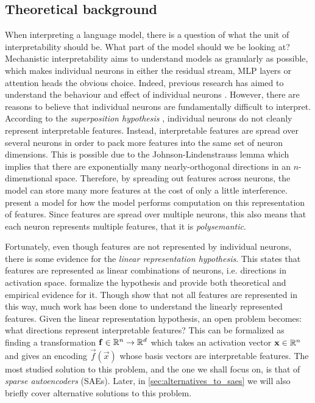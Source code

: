 \subsection{Theoretical background}
When interpreting a language model, there is a question of what the unit of interpretability should be.
What part of the model should we be looking at?
Mechanistic interpretability aims to understand models as granularly as possible, which makes individual neurons in either the residual stream, MLP layers or attention heads the obvious choice.
Indeed, previous research has aimed to understand the behaviour and effect of individual neurons \parencite{foote_neuron_2023}\parencite{bills_language_2023}.
However, there are reasons to believe that individual neurons are fundamentally difficult to interpret.
According to the \emph{superposition hypothesis} \parencite{elhage_toy_2022}, individual neurons do not cleanly represent interpretable features.
Instead, interpretable features are spread over several neurons in order to pack more features into the same set of neuron dimensions.
This is possible due to the Johnson-Lindenstrauss lemma which implies that there are exponentially many nearly-orthogonal directions in an $n$-dimenstional space.
Therefore, by spreading out features across neurons, the model can store many more features at the cost of only a little interference.
\textcite{vaintrob_toward_2024} present a model for how the model performs computation on this representation of features.
Since features are spread over multiple neurons, this also means that each neuron represents multiple features, that it is \emph{polysemantic}.

Fortunately, even though features are not represented by individual neurons, there is some evidence for the \emph{linear representation hypothesis}.
This states that features are represented as linear combinations of neurons, i.e. directions in activation space.
\textcite{park_linear_2023} formalize the hypothesis and provide both theoretical and empirical evidence for it.
Though \textcite{engels_not_2024} show that not all features are represented in this way, much work has been done to understand the linearly represented features.
Given the linear representation hypothesis, an open problem becomes: what directions represent interpretable features?
This can be formalized as finding a transformation $\mathbf{f}\in\mathbb{R}^n\to\mathbb{R}^d$ which takes an activation vector $\mathbf{x}\in\mathbb{R}^n$ and gives an encoding $\vec f(\vec x)$ whose basis vectors are interpretable features.
The most studied solution to this problem, and the one we shall focus on, is that of \emph{sparse autoencoders} (SAEs).
Later, in \ref{sec:alternatives_to_saes} we will also briefly cover alternative solutions to this problem.

